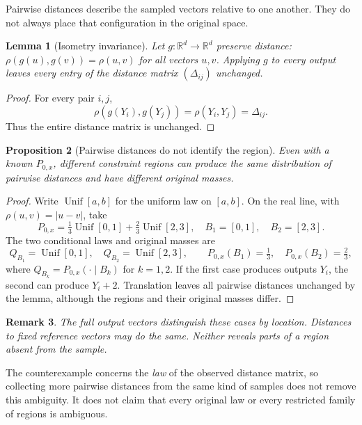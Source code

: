 \documentclass[10pt,letterpaper]{article}
\theoremstyle{typed}
\newtheorem{lemma}{Lemma}
\newtheorem{proposition}[lemma]{Proposition}
\newtheorem{remark}[lemma]{Remark}
\begin{document}
Pairwise distances describe the sampled vectors relative to one another. They do not always place that configuration in the original space.

\begin{lemma}[Isometry invariance]
Let $g:\mathbb{R}^d\to\mathbb{R}^d$ preserve distance: $\rho(g(u),g(v))=\rho(u,v)$ for all vectors $u,v$. Applying $g$ to every output leaves every entry of the distance matrix $(\Delta_{ij})$ unchanged.
\end{lemma}
\begin{proof}
For every pair $i,j$,
\[
  \rho(g(Y_i),g(Y_j))=\rho(Y_i,Y_j)=\Delta_{ij}.
\]
Thus the entire distance matrix is unchanged.
\end{proof}

\begin{proposition}[Pairwise distances do not identify the region]
Even with a known $P_{0,x}$, different constraint regions can produce the same distribution of pairwise distances and have different original masses.
\end{proposition}
\begin{proof}
Write $\operatorname{Unif}[a,b]$ for the uniform law on $[a,b]$. On the real line, with $\rho(u,v)=|u-v|$, take
\begin{equation}
  P_{0,x}=\tfrac13\operatorname{Unif}[0,1]
       +\tfrac23\operatorname{Unif}[2,3],
  \quad B_1=[0,1],\quad B_2=[2,3].
  \label{eq:counterexample}
\end{equation}
The two conditional laws and original masses are
\[
  Q_{B_1}=\operatorname{Unif}[0,1],\quad
  Q_{B_2}=\operatorname{Unif}[2,3],\qquad
  P_{0,x}(B_1)=\tfrac13,\quad P_{0,x}(B_2)=\tfrac23,
\]
where $Q_{B_k}=P_{0,x}(\cdot\mid B_k)$ for $k=1,2$. If the first case produces outputs $Y_i$, the second can produce $Y_i+2$. Translation leaves all pairwise distances unchanged by the lemma, although the regions and their original masses differ.
\end{proof}

\begin{remark}
The full output vectors distinguish these cases by location. Distances to fixed reference vectors may do the same. Neither reveals parts of a region absent from the sample.
\end{remark}

The counterexample concerns the \emph{law} of the observed distance matrix, so collecting more pairwise distances from the same kind of samples does not remove this ambiguity. It does not claim that every original law or every restricted family of regions is ambiguous.
\end{document}
